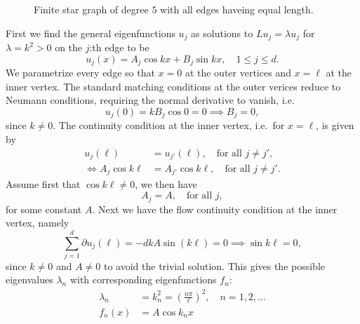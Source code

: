 \begin{figure}[h]
  \centering
  \caption{Finite star graph of degree $5$ with all edges haveing equal length.}
  \label{fig: finite star graph}
\end{figure}


First we find the general eigenfunctions $u_j$ as solutions to $Lu_j = \lambda u_j$ for $\lambda = k^2 > 0$ on the $j$:th edge to be
\[ u_j(x) = A_j\cos kx + B_j \sin kx, \quad 1 \le j \le d. \]
We parametrize every edge so that $x=0$ at the outer vertices and $x=\ell$ at the inner vertex.
The standard matching conditions at the outer verices reduce to Neumann conditions, requiring the normal derivative to vanish, i.e.
\[
  u_j(0) = k B_j \cos 0 = 0 \implies B_j = 0,
\]
since $k \ne 0$.
The continuity condition at the inner vertex, i.e.\ for $x = \ell$, is given by
\begin{align*}
  u_j(\ell) &= u_{j'}(\ell), \quad \text{for all } j \ne j', \\ \iff
  A_j \cos k\ell &= A_{j'} \cos k\ell, \quad \text{for all } j \ne j'.
\end{align*}
Assume first that $\cos k\ell \ne 0$, we then have
\[
  A_j = A, \quad \text{for all } j,
\]
for some constant $A$.
Next we have the flow continuity condition at the inner vertex, namely
\[
  \sum_{j=1}^{d} \partial u_j(\ell) = - d k A \sin(k\ell) = 0 \implies \sin k\ell = 0,
\]
since $k \ne 0$ and $A \ne 0$ to avoid the trivial solution. This gives the possible eigenvalues $\lambda_n$ with corresponding eigenfunctions $f_n$:
\begin{align*}
  \lambda_n &= k_n^2 = \left(\frac{n \pi}{\ell}\right)^2, \quad n = 1, 2, \ldots \\
  f_n(x) &= A\cos k_n x
\end{align*}

